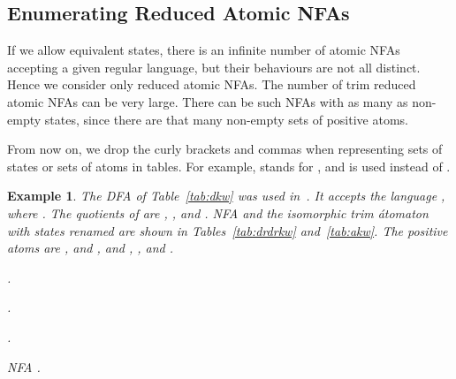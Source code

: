 \documentclass[preprint,12pt]{elsarticle}
\newtheorem{example}{Example}
\begin{document}
\subsection{Enumerating Reduced Atomic NFAs}
If we allow equivalent states, there is an infinite number of atomic NFAs 
accepting a given regular language, but their behaviours are not all distinct.
Hence we consider only reduced atomic NFAs.
The number of trim reduced atomic NFAs can be very large. 
There can be such NFAs with as many as  non-empty states, 
since there are that many non-empty sets of positive atoms. 

From now on, we drop the curly brackets and commas when representing 
sets of states or sets of atoms in tables.
For example,  stands for , and 
 is used instead of .

\begin{example}
\label{ex:reducedatomic}
The DFA of Table~\ref{tab:dkw} was used in~\cite{KaWe70}. 
It accepts the language , where . 
The quotients of  are
, 
, and
.
NFA  and the isomorphic trim \'atomaton  with states renamed  are shown in Tables~\ref{tab:drdrkw} and~\ref{tab:akw}.
The positive atoms are
,  and , and
, 
,
and .


\begin{table}[b]
\begin{minipage}[b]{0.25\linewidth}
\caption{.}
\label{tab:dkw}
{\footnotesize
\begin{center}

\end{center}}
\end{minipage}
\hspace{0.2cm}
\begin{minipage}[b]{0.3\linewidth}
\caption{.}
\label{tab:drdrkw}
{\footnotesize
\begin{center}

\end{center}}
\end{minipage}
\hspace{1cm}
\begin{minipage}[b]{0.25\linewidth}
\caption{.}
\label{tab:akw}
{\footnotesize
\begin{center}

\end{center}}
\end{minipage}
\end{table}


\begin{table}[hbt]
\begin{minipage}[b]{0.45\linewidth}
\caption{NFA .}
\label{tab:b1}
{\footnotesize
\begin{center}


\end{center}}
\end{minipage}
\end{table}
\end{example}
\end{document}
